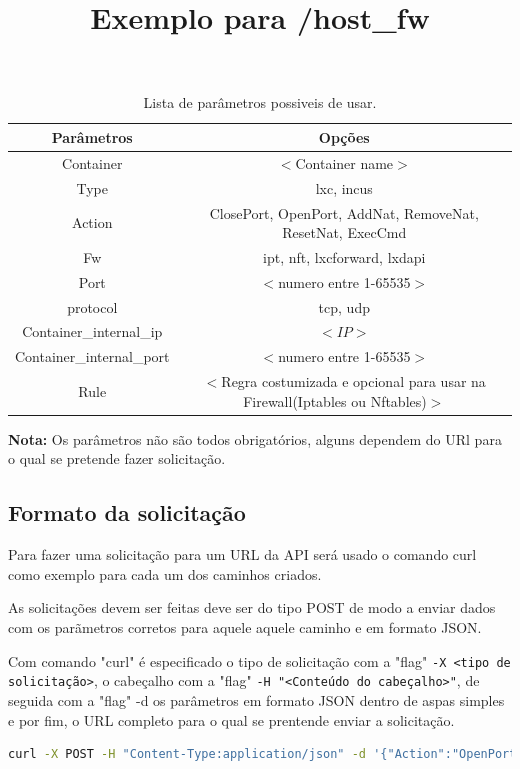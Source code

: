 \begin{table}[H]
\centering
\begin{tabular}{|c|c|}
\hline
\rowcolor{yellow!50}\textbf{Parâmetros} & \textbf{Opções}\\
\hline
Container & $<$Container name$>$\\
\hline
Type & lxc, incus \\
\hline
Action & ClosePort, OpenPort, AddNat, RemoveNat, ResetNat, ExecCmd \\
\hline
Fw & ipt, nft, lxcforward, lxdapi \\
\hline
Port & $<$numero entre 1-65535$>$ \\
\hline
protocol & tcp, udp \\
\hline
Container\_internal\_ip & $<IP>$ \\
\hline
Container\_internal\_port & $<$numero entre 1-65535$>$ \\
\hline
Rule & $<$Regra costumizada e opcional para usar na Firewall(Iptables ou Nftables)$>$ \\
\hline
\end{tabular}
\caption{Lista de parâmetros possiveis de usar.}
\label{arglist}
\end{table}

\textbf{Nota:} Os parâmetros não são todos obrigatórios, alguns dependem do URl para o qual
se pretende fazer solicitação.


\subsection{Formato da solicitação}

Para fazer uma solicitação para um URL da API será usado o comando curl como exemplo para
cada um dos caminhos criados.

As solicitações devem ser feitas deve ser do tipo POST de modo a enviar dados com os parãmetros
corretos para aquele aquele caminho e em formato JSON.

Com comando "curl" é especificado o tipo de solicitação com a "flag" \texttt{-X <tipo de solicitação>},
o cabeçalho com a "flag" \texttt{-H "<Conteúdo do cabeçalho>"}, de seguida com a "flag" -d os parâmetros
em formato JSON dentro de aspas simples e por fim, o URL completo para o qual se prentende enviar a
solicitação.



\title*{Exemplo para \slash \textbf{host\_fw}}

\begin{lstlisting}[language=Bash, caption={Exemplo de solicitação para a firewal do sistema host}]
    curl -X POST -H "Content-Type:application/json" -d '{"Action":"OpenPort","Fw":"ipt","Protocol":"tcp","Port":"22"}' http://localhost:5000/host_fw
\end{lstlisting}



